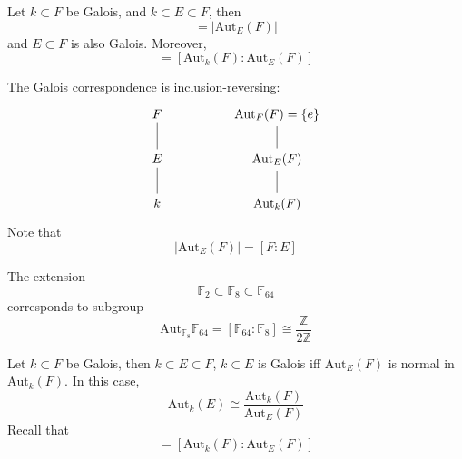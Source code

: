\documentclass[openany]{book}
\newcommand{\Z}{\mathbb{Z}}
\newcommand{\F}{\mathbb{F}}
\newcommand{\aut}{\text{Aut}}
\begin{document}
\begin{prop}
    Let $k\subset F$ be Galois, and $k\subset E\subset F$, then 
    \begin{equation*}
        [F:E]=|\aut_E(F)|
    \end{equation*}
    and $E\subset F$ is also Galois. Moreover, 
    \begin{equation*}
        [E:k]=[\aut_k(F):\aut_E(F)]
    \end{equation*}
\end{prop}

\begin{prop}
    The Galois correspondence is inclusion-reversing: 
    \[\begin{tikzcd}
        F && {\text{Aut}_F(F)=\{e\}} \\
        E && {\text{Aut}_E(F)} \\
        k && {\text{Aut}_k(F)}
        \arrow[no head, from=2-1, to=1-1]
        \arrow[no head, from=2-3, to=1-3]
        \arrow[no head, from=3-1, to=2-1]
        \arrow[no head, from=3-3, to=2-3]
    \end{tikzcd}\]
    Note that 
    \begin{equation*}
        |\aut_E(F)|=[F:E]
    \end{equation*}
\end{prop}

\begin{example}
    The extension 
    \begin{equation*}
        \F_2\subset\F_8\subset\F_{64}
    \end{equation*}
    corresponds to subgroup 
    \begin{equation*}
        \aut_{\F_{8}}\F_{64}=[\F_{64}:\F_{8}]\cong\frac{\Z}{2\Z}
    \end{equation*}
\end{example}

\begin{prop}
    Let $k\subset F$ be Galois, then $k\subset E\subset F$, $k\subset E$ is Galois iff $\aut_E(F)$ is normal in $\aut_k(F)$. In this case, 
    \begin{equation*}
        \aut_k(E)\cong\frac{\aut_k(F)}{\aut_E(F)}
    \end{equation*}
    Recall that 
    \begin{equation*}
        [E:k]=[\aut_k(F):\aut_E(F)]
    \end{equation*}
\end{prop}
\end{document}
